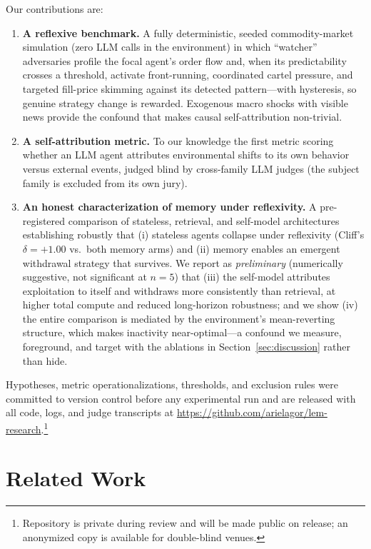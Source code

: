 \documentclass{article}
\begin{document}
Our contributions are:
\begin{enumerate}
\item \textbf{A reflexive benchmark.} A fully deterministic, seeded commodity-market simulation (zero LLM calls in the environment) in which ``watcher'' adversaries profile the focal agent's order flow and, when its predictability crosses a threshold, activate front-running, coordinated cartel pressure, and targeted fill-price skimming against its detected pattern---with hysteresis, so genuine strategy change is rewarded. Exogenous macro shocks with visible news provide the confound that makes causal self-attribution non-trivial.
\item \textbf{A self-attribution metric.} To our knowledge the first metric scoring whether an LLM agent attributes environmental shifts to its own behavior versus external events, judged blind by cross-family LLM judges (the subject family is excluded from its own jury).
\item \textbf{An honest characterization of memory under reflexivity.} A pre-registered comparison of stateless, retrieval, and self-model architectures establishing robustly that (i) stateless agents collapse under reflexivity (Cliff's $\delta=+1.00$ vs.\ both memory arms) and (ii) memory enables an emergent withdrawal strategy that survives. We report as \emph{preliminary} (numerically suggestive, not significant at $n=5$) that (iii) the self-model attributes exploitation to itself and withdraws more consistently than retrieval, at higher total compute and reduced long-horizon robustness; and we show (iv) the entire comparison is mediated by the environment's mean-reverting structure, which makes inactivity near-optimal---a confound we measure, foreground, and target with the ablations in Section~\ref{sec:discussion} rather than hide.
\end{enumerate}

Hypotheses, metric operationalizations, thresholds, and exclusion rules were committed to version control before any experimental run and are released with all code, logs, and judge transcripts at \url{https://github.com/arielagor/lem-research}.\footnote{Repository is private during review and will be made public on release; an anonymized copy is available for double-blind venues.}

\section{Related Work}
\end{document}
